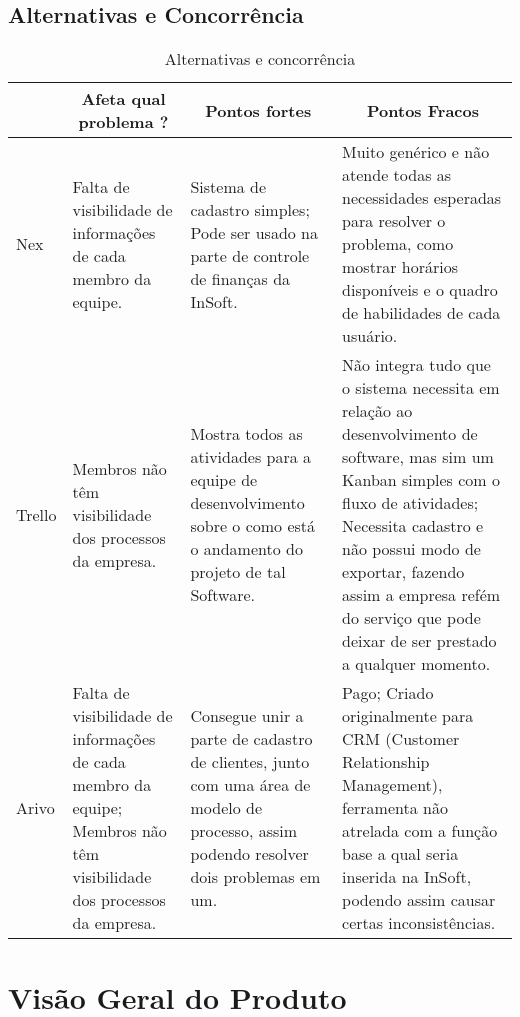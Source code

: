     \subsection{Alternativas e Concorrência}
       \label{subsec:Concorrentes}
      \begin{table}[H]
        \centering
        \begin{tabular}{|p{}|p{}|p{}|p{}|}
          \hline
          \rowcolor[HTML]{C0C0C0}
          \multicolumn{1}{c}{Produto} & \multicolumn{1}{|c|}{Afeta qual problema ?} & \multicolumn{1}{|c|}{Pontos fortes} & \multicolumn{1}{|c|}{Pontos Fracos} \\ \hline
            Nex
              & Falta de visibilidade de informações de cada membro da equipe.
              & Sistema de cadastro simples;
                Pode ser usado na parte de controle de finanças da InSoft.
              & Muito genérico e não atende todas as necessidades esperadas para resolver o problema, como mostrar horários disponíveis e o quadro de habilidades de cada usuário. \\ \hline
            Trello
              & Membros não têm visibilidade dos processos da empresa.
              & Mostra todos as atividades para a equipe de desenvolvimento sobre o como está o andamento do projeto de tal Software.
              & Não integra tudo que o sistema necessita em relação ao desenvolvimento de software, mas sim um Kanban simples com o fluxo de atividades;
                Necessita cadastro e não possui modo de exportar, fazendo assim a empresa refém do serviço que pode deixar de ser prestado a qualquer momento. \\ \hline
            Arivo
              & Falta de visibilidade de informações de cada membro da equipe;
                Membros não têm visibilidade dos processos da empresa.
              & Consegue unir a parte de cadastro de clientes, junto com uma área de modelo de processo, assim podendo resolver dois problemas em um.
              & Pago;
                Criado originalmente para CRM (Customer Relationship Management), ferramenta não atrelada com a função base a qual seria inserida na InSoft, podendo assim causar certas inconsistências. \\ \hline
        \end{tabular}
        \caption{Alternativas e concorrência}
      \end{table}

  \section{Visão Geral do Produto}

